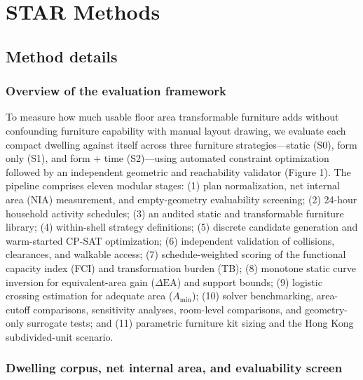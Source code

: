 \documentclass[12pt,letterpaper]{article}
\begin{document}
\section{STAR Methods}\label{star-methods}

\subsection{Method details}\label{method-details}

\subsubsection{Overview of the evaluation framework}\label{overview-of-the-evaluation-framework}

To measure how much usable floor area transformable furniture adds without confounding furniture capability with manual layout drawing, we evaluate each compact dwelling against itself across three furniture strategies---static (S0), form only (S1), and form + time (S2)---using automated constraint optimization followed by an independent geometric and reachability validator (Figure 1). The pipeline comprises eleven modular stages: (1) plan normalization, net internal area (NIA) measurement, and empty-geometry evaluability screening; (2) 24-hour household activity schedules; (3) an audited static and transformable furniture library; (4) within-shell strategy definitions; (5) discrete candidate generation and warm-started CP-SAT optimization; (6) independent validation of collisions, clearances, and walkable access; (7) schedule-weighted scoring of the functional capacity index (FCI) and transformation burden (TB); (8) monotone static curve inversion for equivalent-area gain (\(\Delta\text{EA}\)) and support bounds; (9) logistic crossing estimation for adequate area (\(A_{\min}\)); (10) solver benchmarking, area-cutoff comparisons, sensitivity analyses, room-level comparisons, and geometry-only surrogate tests; and (11) parametric furniture kit sizing and the Hong Kong subdivided-unit scenario.

\subsubsection{Dwelling corpus, net internal area, and evaluability screen}\label{dwelling-corpus-net-internal-area-and-evaluability-screen}
\end{document}
